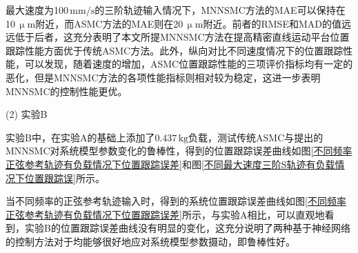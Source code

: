 最大速度为100\,$\text{mm/s}$的三阶轨迹输入情况下，MNNSMC方法的MAE可以保持在10\,$\upmu$$\text{m}$附近，而ASMC方法的MAE则在20\,$\upmu$$\text{m}$附近。前者的RMSE和MAD的值远远低于后者，这充分表明了本文所提MNNSMC方法在提高精密直线运动平台位置跟踪性能方面优于传统ASMC方法。此外，纵向对比不同速度情况下的位置跟踪性能，可以发现，随着速度的增加，ASMC位置跟踪性能的三项评价指标均有一定的恶化，但是MNNSMC方法的各项性能指标则相对较为稳定，这进一步表明MNNSMC的控制性能更优。

(2) 实验B

实验B中，在实验A的基础上添加了$0.437\,\text{kg}$负载，测试传统ASMC与提出的MNNSMC对系统模型参数变化的鲁棒性，得到的位置跟踪误差曲线如图\ref{不同频率正弦参考轨迹有负载情况下位置跟踪误差}和图\ref{不同最大速度三阶S轨迹有负载情况下位置跟踪误}所示。

当不同频率的正弦参考轨迹输入时，得到的系统位置跟踪误差曲线如图\ref{不同频率正弦参考轨迹有负载情况下位置跟踪误差}所示，与实验A相比，可以直观地看到，实验B的位置跟踪误差曲线没有明显的变化，这充分说明了两种基于神经网络的控制方法对于均能够很好地应对系统模型参数摄动，即鲁棒性好。

